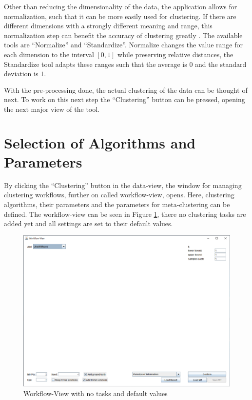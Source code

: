 \documentclass[
	a4paper,
	english,
	twoside,
	openright,               
	11pt                            
	]{report}
\begin{document}
Other than reducing the dimensionality of the data, the application allows for normalization, such that it can be more easily used for clustering. If there are different dimensions with a strongly different meaning and range, this normalization step can benefit the accuracy of clustering greatly \cite{normalization}. The available tools are ``Normalize'' and ``Standardize''. Normalize changes the value range for each dimension to the interval $[0,1]$ while preserving relative distances, the Standardize tool adapts these ranges such that the average is $0$ and the standard deviation is $1$.

With the pre-processing done, the actual clustering of the data can be thought of next. To work on this next step the ``Clustering'' button can be pressed, opening the next major view of the tool.

\section{Selection of Algorithms and Parameters}\label{sec:sel_alg_param}
By clicking the ``Clustering'' button in the data-view, the window for managing clustering workflows, further on called workflow-view, opens. Here, clustering algorithms, their parameters and the parameters for meta-clustering can be defined. The workflow-view can be seen in Figure \ref{fig:workflow-view}, there no clustering tasks are added yet and all settings are set to their default values.

\begin{figure}[h]
	\centering
	\includegraphics[scale=.43]{workflow-view}
	\caption{Workflow-View with no tasks and default values}
	\label{fig:workflow-view}
\end{figure}
\end{document}
